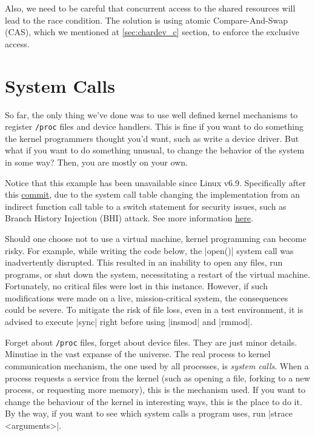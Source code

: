 \documentclass[10pt, oneside]{book}
\begin{document}
Also, we need to be careful that concurrent access to the shared resources will lead to the race condition.
The solution is using atomic Compare-And-Swap (CAS), which we mentioned at \ref{sec:chardev_c} section, to enforce the exclusive access.




\section{System Calls}
\label{sec:syscall}
So far, the only thing we've done was to use well defined kernel mechanisms to register \verb|/proc| files and device handlers.
This is fine if you want to do something the kernel programmers thought you'd want, such as write a device driver.
But what if you want to do something unusual, to change the behavior of the system in some way?
Then, you are mostly on your own.

Notice that this example has been unavailable since Linux v6.9.
Specifically after this \href{https://github.com/torvalds/linux/commit/1e3ad78334a69b36e107232e337f9d693dcc9df2#diff-4a16bf89a09b4f49669a30d54540f0b936ea0224dc6ee9edfa7700deb16c3e11R52}{commit}, due to the system call table changing the implementation from an indirect function call table to a switch statement for security issues, such as Branch History Injection (BHI) attack.
See more information \href{https://bugs.launchpad.net/ubuntu/+source/linux/+bug/2060909}{here}.

Should one choose not to use a virtual machine, kernel programming can become risky.
For example, while writing the code below, the \cpp|open()| system call was inadvertently disrupted.
This resulted in an inability to open any files, run programs, or shut down the system, necessitating a restart of the virtual machine.
Fortunately, no critical files were lost in this instance.
However, if such modifications were made on a live, mission-critical system, the consequences could be severe.
To mitigate the risk of file loss, even in a test environment, it is advised to execute \sh|sync| right before using \sh|insmod| and \sh|rmmod|.

Forget about \verb|/proc| files, forget about device files.
They are just minor details.
Minutiae in the vast expanse of the universe.
The real process to kernel communication mechanism, the one used by all processes, is \emph{system calls}.
When a process requests a service from the kernel (such as opening a file, forking to a new process, or requesting more memory), this is the mechanism used.
If you want to change the behaviour of the kernel in interesting ways, this is the place to do it.
By the way, if you want to see which system calls a program uses, run \sh|strace <arguments>|.
\end{document}
